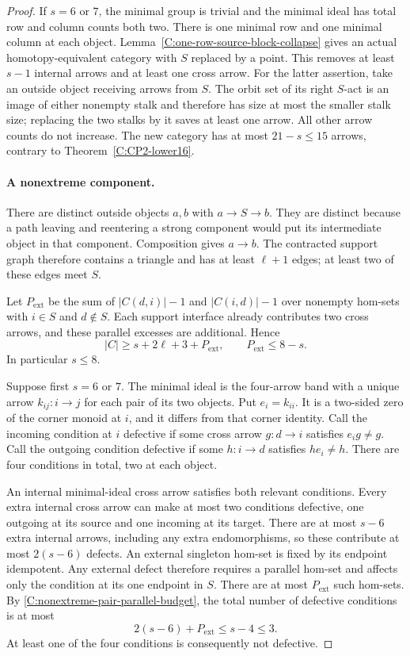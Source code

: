 \begin{proof}
If $s=6$ or $7$, the minimal group is trivial and the
minimal ideal has total row and column counts both two.
There is one minimal row and one minimal column at
each object.  Lemma~\ref{C:one-row-source-block-collapse}
gives an actual homotopy-equivalent category with $S$
replaced by a point.  This removes at least $s-1$
internal arrows and at least one cross arrow.  For the
latter assertion, take an outside object receiving
arrows from $S$.  The orbit set of its right $S$-act
is an image of either nonempty stalk and therefore
has size at most the smaller stalk size; replacing
the two stalks by it saves at least one arrow.
All other arrow counts do not increase.  The new
category has at most $21-s\leq15$ arrows, contrary
to Theorem~\ref{C:CP2-lower16}.

\paragraph{A nonextreme component.}
There are distinct outside objects $a,b$ with
$a\to S\to b$.  They are distinct because a path
leaving and reentering a strong component would put
its intermediate object in that component.
Composition gives $a\to b$.  The contracted support
graph therefore contains a triangle and has at least
$\ell+1$ edges; at least two of these edges meet $S$.

Let $P_{\mathrm{ext}}$ be the sum of $|C(d,i)|-1$
and $|C(i,d)|-1$ over nonempty hom-sets with $i\in S$
and $d\notin S$.  Each support interface already
contributes two cross arrows, and these parallel
excesses are additional.  Hence
\begin{equation}\label{C:nonextreme-pair-parallel-budget}
 |C|\geq s+2\ell+3+P_{\mathrm{ext}},
 \qquad
 P_{\mathrm{ext}}\leq8-s.
\end{equation}
In particular $s\leq8$.

Suppose first $s=6$ or $7$.  The minimal ideal is the
four-arrow band with a unique arrow $k_{ij}:i\to j$
for each pair of its two objects.  Put $e_i=k_{ii}$.
It is a two-sided zero of the corner monoid at $i$,
and it differs from that corner identity.
Call the incoming condition at $i$ defective if some
cross arrow $g:d\to i$ satisfies $e_i g\ne g$.
Call the outgoing condition defective if some
$h:i\to d$ satisfies $h e_i\ne h$.
There are four conditions in total, two at each object.

An internal minimal-ideal cross arrow satisfies both
relevant conditions.  Every extra internal cross arrow
can make at most two conditions defective, one outgoing
at its source and one incoming at its target.  There
are at most $s-6$ extra internal arrows, including any
extra endomorphisms, so these contribute at most
$2(s-6)$ defects.  An external singleton hom-set is
fixed by its endpoint idempotent.  Any external defect
therefore requires a parallel hom-set and affects only
the condition at its one endpoint in $S$.
There are at most $P_{\mathrm{ext}}$ such hom-sets.
By \eqref{C:nonextreme-pair-parallel-budget}, the total
number of defective conditions is at most
\[
 2(s-6)+P_{\mathrm{ext}}\leq s-4\leq3.
\]
At least one of the four conditions is consequently
not defective.


\end{proof}
